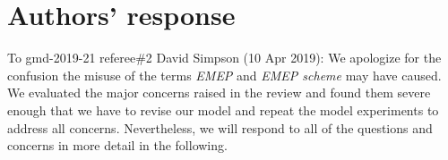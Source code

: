 
%
\section*{Authors' response}
To gmd-2019-21 referee\#2 David Simpson (10 Apr 2019):
We apologize for the confusion the misuse of the terms \emph{EMEP} and \emph{EMEP scheme} may have caused. We evaluated the major concerns raised in the review and found them severe enough that we have to revise our model and repeat the model experiments to address all concerns. Nevertheless, we will respond to all of the questions and concerns in more detail in the following.

